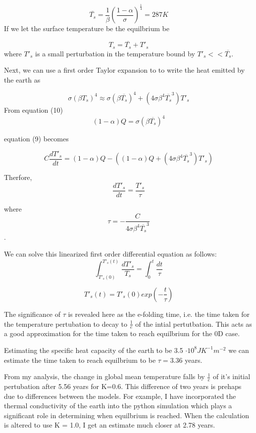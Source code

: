 \documentclass{article}%
\begin{document}
\begin{equation}
  \overline{T_{s}} = \frac{1}{\beta}(\frac{1 - \alpha}{\sigma})^{\frac{1}{4}} = 287K
\end{equation}
If we let the surface temperature be the equilbrium be

$$ T_{s} = \overline{T_{s}} + {T'_{s}} $$ where ${T'_{s}}$ is a small perturbation in the temperature bound by ${T'_{s}} << \overline{T_{s}}$.

Next, we can use a first order Taylor expansion to to write the heat emitted by the earth as

$$\sigma(\beta T_{s})^{4} \approx \sigma(\beta \overline{T_{s}})^{4} + (4\sigma \beta^4 \overline{T_{s}}^3){T'_{s}} $$
From equation (10) $$ (1 - \alpha)Q = \sigma( \beta \overline{T_{s}})^4 $$

equation (9) becomes 

$$C \frac{dT'_{s}}{dt} = (1 - \alpha)Q - ( (1 - \alpha)Q +(4\sigma \beta^4 \overline{T_{s}}^3){T'_{s}}) $$

Therfore,
\begin{equation}
  \frac{dT'_{s}}{dt} = \frac{{T'_{s}}}{\tau}
\end{equation}

where $$ \tau = -\frac{C}{4\sigma \beta^4 \overline{T_{s}}^3} $$.

We can solve this linearized first order differential equation as follows:
$$ \int_{{T'_{s}}(0)}^{{T'_{s}}(t)} \frac{d {T'_{s}}}{T_{s}} = \int_{0}^{t} \frac{dt}{\tau}$$

\begin{equation}
  {T'_{s}}(t) = {T'_{s}}(0) exp(-\frac{t}{\tau})
\end{equation}

The significance of $\tau$ is revealed here as the e-folding time, i.e. the time taken for the temperature pertubation to decay to $\frac{1}{e}$ of the intial pertutbation.
This acts as a good approximation for the time taken to reach equilbrium for the 0D case. 

Estimating the specific heat capacity of the earth to be 3.5 $\cdot 10^{8} JK^{-1}m^{-2}$ we can estimate the time taken to reach equilbrium to be 
$ \tau = 3.36 $ years.

From my analysis, the change in global mean temperature falls by $\frac{1}{e}$ of it's initial pertubation after 5.56 years for K=0.6. This difference of two years is prehaps due to differences between the models.
For example, I have incorporated the thermal conductivity of the earth into the python simulation which plays a significant role in determining when equilbrium is reached. When the calculation is altered to use K = 1.0, I get an estimate much closer at 2.78 years.
\end{document}
